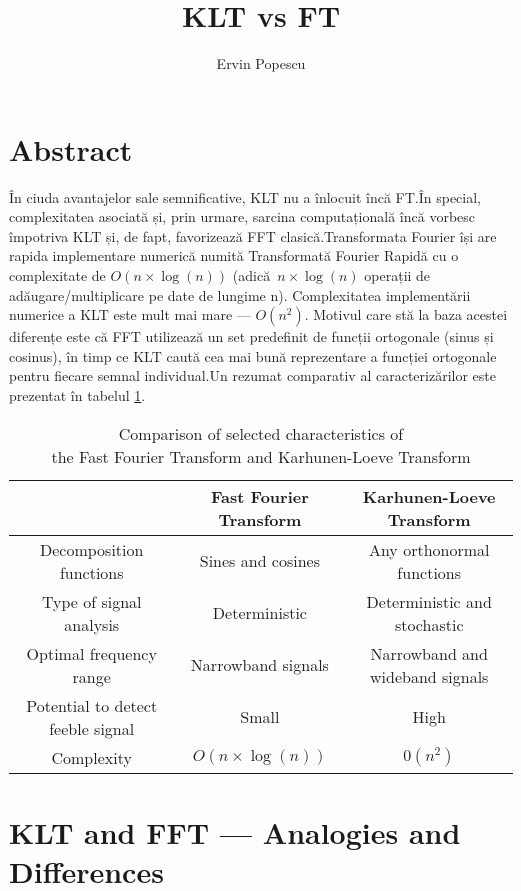 \documentclass[12pt]{report}
\author{Ervin Popescu}
\title{KLT vs FT}
\date{}
\begin{document}
\maketitle

\section*{Abstract}
În ciuda avantajelor sale semnificative, KLT nu a înlocuit încă FT.\@ În special, complexitatea asociată și, prin urmare, sarcina computațională încă vorbesc împotriva KLT și, de fapt, favorizează FFT clasică.\@ Transformata Fourier își are rapida implementare numerică numită Transformată Fourier Rapidă cu o complexitate de \(O(n\times\log(n))\) (adică\ \(n\times\log(n)\) operații de adăugare/multiplicare pe date de lungime n).
Complexitatea implementării numerice a KLT este mult mai mare — \(O(n^2)\).
Motivul care stă la baza acestei diferențe este că FFT utilizează un set predefinit de funcții ortogonale (sinus și cosinus),
în timp ce KLT caută cea mai bună reprezentare a funcției ortogonale pentru fiecare semnal individual.\@ Un rezumat comparativ al caracterizărilor este prezentat în tabelul \ref{table:1}.
\begin{table}[H]
	\centering
	\begin{tabular}{ |c | c | c| }
		\hline
		\                                 & Fast Fourier Transform & Karhunen-Loeve Transform        \\
		\hline
		Decomposition functions           & Sines and cosines      & Any orthonormal functions       \\
		\hline
		Type of signal analysis           & Deterministic          & Deterministic and stochastic    \\
		\hline
		Optimal frequency range           & Narrowband signals     & Narrowband and wideband signals \\
		\hline
		Potential to detect feeble signal & Small                  & High                            \\
		\hline
		Complexity                        & $O(n\times\log(n))$    & $0(n^2)$                        \\
		\hline
	\end{tabular}
	\caption{Comparison of selected characteristics of \\the Fast Fourier Transform and Karhunen-Loeve Transform}
	\label{table:1}
\end{table}

\section*{KLT and FFT --- Analogies and Differences}
\end{document}
